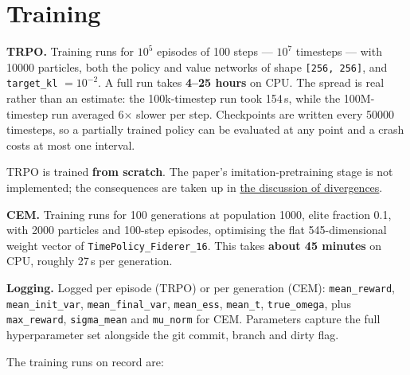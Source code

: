 \documentclass[12pt,a4paper]{article}
\begin{document}
\FloatBarrier
\section{Training}\label{sec:training}
\textbf{TRPO.} Training runs for $10^5$ episodes of 100 steps --- $10^7$ timesteps --- with \num{10000} particles, both the policy and value networks of shape \texttt{[256, 256]}, and \texttt{target\_\allowbreak{}kl} $= 10^{-2}$. A full run takes \textbf{4--25 hours} on CPU. The spread is real rather than an estimate: the 100k-timestep run took 154\,s, while the 100M-timestep run averaged 6$\times$ slower per step. Checkpoints are written every \num{50000} timesteps, so a partially trained policy can be evaluated at any point and a crash costs at most one interval.

TRPO is trained \textbf{from scratch}. The paper's imitation-pretraining stage is not implemented; the consequences are taken up in \hyperref[sec:no-imitation-pretraining--the-leading-hypothesis-for-the-gap]{the discussion of divergences}.

\textbf{CEM.} Training runs for 100 generations at population 1000, elite fraction 0.1, with 2000 particles and 100-step episodes, optimising the flat 545-dimensional weight vector of \texttt{TimePolicy\_\allowbreak{}Fiderer\_\allowbreak{}16}. This takes \textbf{about 45 minutes} on CPU, roughly 27\,s per generation.

\textbf{Logging.} Logged per episode (TRPO) or per generation (CEM): \texttt{mean\_\allowbreak{}reward}, \texttt{mean\_\allowbreak{}init\_\allowbreak{}var}, \texttt{mean\_\allowbreak{}final\_\allowbreak{}var}, \texttt{mean\_\allowbreak{}ess}, \texttt{mean\_\allowbreak{}t}, \texttt{true\_\allowbreak{}omega}, plus \texttt{max\_\allowbreak{}reward}, \texttt{sigma\_\allowbreak{}mean} and \texttt{mu\_\allowbreak{}norm} for CEM. Parameters capture the full hyperparameter set alongside the git commit, branch and dirty flag.

The training runs on record are:
\end{document}
